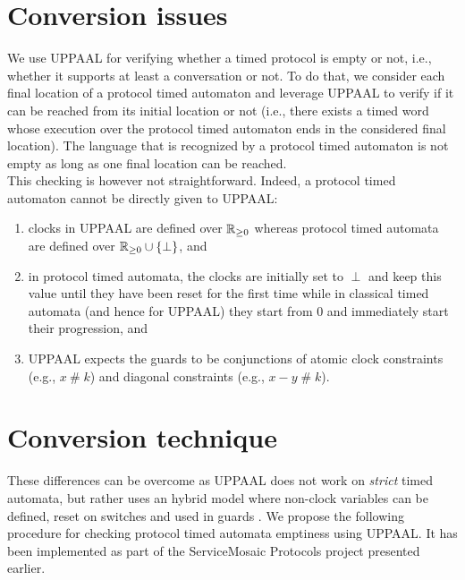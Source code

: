 \section{Conversion issues}


We use UPPAAL for verifying whether a timed protocol is empty or not, i.e., whether it supports at least a conversation or not. To do that, we consider each final location of a protocol timed automaton and leverage UPPAAL to verify if it can be reached from its initial location or not (i.e., there exists a timed word whose execution over the protocol timed automaton ends in the considered final location). The language that is recognized by a protocol timed automaton is not empty as long as one final location can be reached.\\

This checking is however not straightforward. Indeed, a protocol timed automaton cannot be directly given to UPPAAL:
\begin{enumerate}
  
  \item clocks in UPPAAL are defined over $\mathbb{R}_{\geq 0}$ whereas protocol timed automata are defined over $\mathbb{R}_{\geq 0} \cup \{ \perp \}$, and
  
  \item in protocol timed automata, the clocks are initially set to $\perp$ and keep this value until they have been reset for the first time while in classical timed automata (and hence for UPPAAL) they start from 0 and immediately start their progression, and
  
  \item UPPAAL expects the guards to be conjunctions of atomic clock constraints (e.g., $x \:\#\; k$) and diagonal constraints (e.g., $x - y \;\#\; k$).
  
\end{enumerate}


\section{Conversion technique}


These differences can be overcome as UPPAAL does not work on \emph{strict} timed automata, but rather uses an hybrid model where non-clock variables can be defined, reset on switches and used in guards \cite{UPPAAL}. We propose the following procedure for checking protocol timed automata emptiness using UPPAAL. It has been implemented as part of the ServiceMosaic Protocols project presented earlier.

